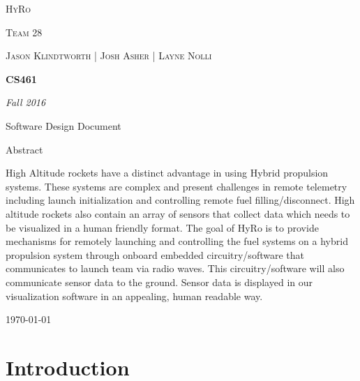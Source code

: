 \documentclass[10pt,draftclsnofoot,onecolumn,compsoc]{IEEEtran}
\begin{document}
\begin{titlepage}
	\centering
	{\scshape\LARGE HyRo \par}
	{\scshape\LARGE Team 28\par}
	\vspace{1cm}
	{\scshape\Large Jason Klindtworth  |  Josh Asher  |   Layne Nolli}
	\noindent\makebox[\linewidth]{\rule{17cm}{2pt}}
	\vspace{1cm}
	{\huge\bfseries CS461\par}
	\vspace{2cm}
	{\Large\itshape Fall 2016\par}
	\vspace{4cm}
	{\large Software Design Document\par}\vspace{2cm}
	{\large Abstract\par}
	\vspace{1cm}
	High Altitude rockets have a distinct advantage in using Hybrid propulsion systems. These systems are complex and present challenges in remote telemetry including launch initialization and controlling remote fuel filling/disconnect. High altitude rockets also contain an array of sensors that collect data which needs to be visualized in a human friendly format. The goal of HyRo is to provide mechanisms for remotely launching and controlling the fuel systems on a hybrid propulsion system through onboard embedded circuitry/software that communicates to launch team via radio waves. This circuitry/software will also communicate sensor data to the ground. Sensor data is displayed in our visualization software in an appealing, human readable way. \par

	\noindent\makebox[\linewidth]{\rule{17cm}{2pt}}
	\vfill

	{\large \today\par}
\end{titlepage}


\setcounter{tocdepth}{2}
\tableofcontents
\newpage

\section{Introduction}
\end{document}
